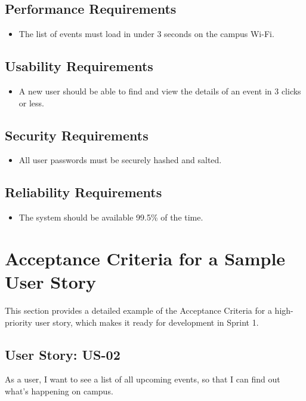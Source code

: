 \documentclass[11pt, a4paper]{article}
\begin{document}
\subsection{Performance Requirements}
\begin{itemize}
    \item The list of events must load in under 3 seconds on the campus Wi-Fi.
\end{itemize}

\subsection{Usability Requirements}
\begin{itemize}
    \item A new user should be able to find and view the details of an event in 3 clicks or less.
\end{itemize}

\subsection{Security Requirements}
\begin{itemize}
    \item All user passwords must be securely hashed and salted.
\end{itemize}
    
\subsection{Reliability Requirements}
\begin{itemize}
    \item The system should be available 99.5\% of the time.
\end{itemize}

\appendix
\newpage

\section{Acceptance Criteria for a Sample User Story}
This section provides a detailed example of the Acceptance Criteria for a high-priority user story, which makes it ready for development in Sprint 1.

\subsection*{User Story: US-02}
As a user, I want to see a list of all upcoming events, so that I can find out what's happening on campus.
\end{document}
